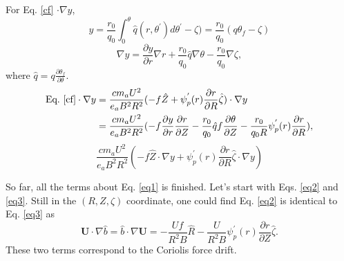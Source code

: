 \documentclass[12pt]{article}
\begin{document}
\begin{CJK*}{UTF8}{gbsn}
For Eq. \ref{cf} $\cdot \nabla y$, 
\begin{equation}
    y = \frac{r_0}{q_0}\int_{0}^{\theta}\hat{q}(r,\theta^{'})d\theta^{'}-\zeta)=\frac{r_0}{q_0}(q\theta_f-\zeta)
\end{equation}
\begin{equation}
    \nabla y = \frac{\partial y}{\partial r} \nabla r + \frac{r_0}{q_0} \hat{q} \nabla \theta - \frac{r_0}{q_0} \nabla \zeta,\label{eqdely}
\end{equation}
where $\hat{q} = q \frac{\partial \theta_f}{\partial \theta}$. 
\begin{equation}
\begin{split}
    \textrm{Eq.}\ \ref{cf} \cdot \nabla y &= \frac{cm_aU^2}{e_aB^2R^2}(-f\hat{Z} + \psi_p^{'}(r)\frac{\partial r}{\partial R} \hat{\zeta}) \cdot \nabla y \\
                                   &= \frac{cm_aU^2}{e_aB^2R^2}(-f \frac{\partial y}{\partial r} \frac{\partial r}{\partial Z} - \frac{r_0}{q_0} \hat{q} f 
                                      \frac{\partial \theta}{\partial Z} - \frac{r_0}{q_0R} \psi_p^{'}(r)\frac{\partial r}{\partial R}), 
\end{split}
\end{equation}
{\color{blue}
\begin{equation*}
    \frac{cm_aU^2}{e_aB^2R^2}(-f\hat{Z}\cdot\nabla y + \psi_p^{'}(r)\frac{\partial r}{\partial R} \hat{\zeta}\cdot\nabla y)  
\end{equation*}
}

So far, all the terms about Eq. \ref{eq1} is finished. Let's start with Eqs. \ref{eq2} and \ref{eq3}.
Still in the $(R,Z,\zeta)$ coordinate, one could find Eq. \ref{eq2} is identical to Eq. \ref{eq3} as
\begin{equation}
    \mathbf{U}\cdot\nabla\hat{b} = \hat{b}\cdot\nabla\mathbf{U} = - \frac{Uf}{R^2B}\hat{R} - \frac{U}{R^2B}\psi_p^{'}(r)\frac{\partial r}{\partial Z}\hat{\zeta}.
\end{equation}
These two terms correspond to the Coriolis force drift.


\end{CJK*}
\end{document}
